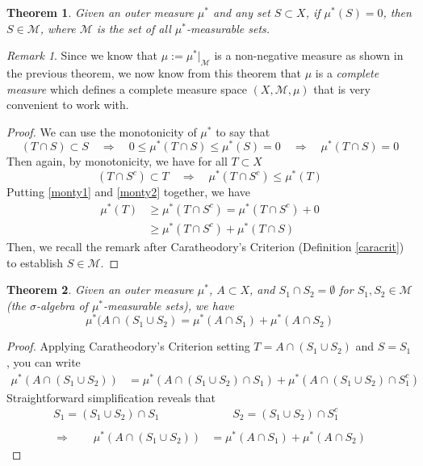 \documentclass[12pt]{article}
\theoremstyle{plain}
\newtheorem{thm}{Theorem}[subsection]
\theoremstyle{definition}
\theoremstyle{remark}
\newtheorem*{rmk}{Remark}
\begin{document}
\begin{thm}
Given an outer measure $\mu^*$ and any set $S\subset X$, if $\mu^*(S)=0$, then $S\in\mathscr{M}$, where $\mathscr{M}$ is the set of all $\mu^*$-measurable sets. 
\end{thm}
\begin{rmk}
Since we know that $\mu:=\mu^*|_{\mathscr{M}}$ is a non-negative measure as shown in the previous theorem, we now know from this theorem that $\mu$ is a \emph{complete measure} which defines a complete measure space $(X, \mathscr{M}, \mu)$ that is very convenient to work with.
\end{rmk}
\begin{proof}
We can use the monotonicity of $\mu^*$ to say that
\begin{equation}
    \label{monty1}
    (T\cap S) \subset S 
    \quad \Rightarrow\quad
    0\leq\mu^*(T\cap S) \leq \mu^*(S) = 0
    \quad \Rightarrow\quad
    \mu^*(T\cap S) = 0 
\end{equation}
Then again, by monotonicity, we have for all $T\subset X$
\begin{equation}
    \label{monty2}
    (T\cap S^c) \subset T
    \quad \Rightarrow\quad
    \mu^*(T\cap S^c) \leq \mu^*(T)
\end{equation}
Putting \ref{monty1} and \ref{monty2} together, we have
\begin{align*}
    \mu^*(T) &\geq 
    \mu^*(T\cap S^c) =  
    \mu^*(T\cap S^c) + 0  \\
    &\geq \mu^*(T\cap S^c) + \mu^*(T\cap S)
\end{align*}
Then, we recall the remark after Caratheodory's Criterion (Definition \ref{caracrit}) to establish $S\in\mathscr{M}$.

\end{proof}

\begin{thm}
Given an outer measure $\mu^*$, $A\subset X$, and $S_1\cap S_2=\emptyset$ for $S_1,S_2\in\mathscr{M}$ (the $\sigma$-algebra of $\mu^*$-measurable sets), we have
\[
    \mu^*(A\cap (S_1\cup S_2) = 
    \mu^*(A\cap S_1) + 
    \mu^*(A\cap S_2) 
\]
\end{thm}
\begin{proof}
Applying Caratheodory's Criterion setting $T=A\cap (S_1\cup S_2)$ and $S=S_1$, you can write
\begin{align*}
    \mu^*(A\cap(S_1\cup S_2)) 
        &= \mu^*( A \cap (S_1 \cup S_2) \cap S_1)
        + \mu^*( A \cap (S_1 \cup S_2) \cap S^c_1) 
\end{align*}
Straightforward simplification reveals that 
\begin{align*}
    S_1 = (S_1 \cup S_2) \cap S_1 &\qquad
    S_2 = (S_1 \cup S_2) \cap S^c_1 \\\\
    \Rightarrow\qquad \mu^*(A\cap(S_1\cup S_2)) 
        &= \mu^*( A \cap S_1)
        + \mu^*( A \cap S_2)
\end{align*}
\end{proof}
\end{document}

